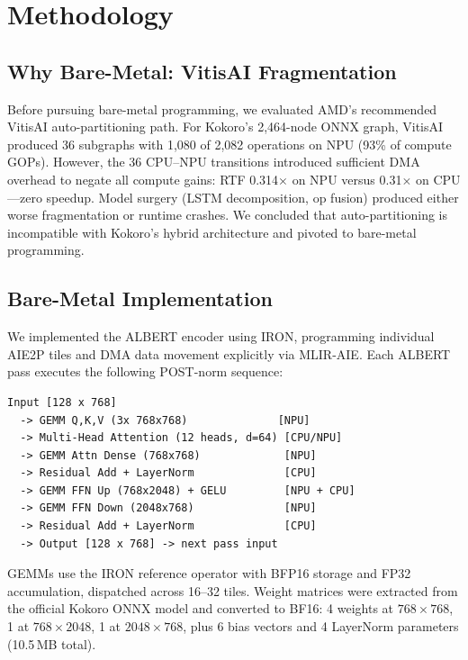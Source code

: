 \documentclass[11pt]{article}
\begin{document}
\section{Methodology}

\subsection{Why Bare-Metal: VitisAI Fragmentation}
\label{sec:vitisai}

Before pursuing bare-metal programming, we evaluated AMD's recommended VitisAI auto-partitioning path. For Kokoro's 2,464-node ONNX graph, VitisAI produced 36 subgraphs with 1,080 of 2,082 operations on NPU (93\% of compute GOPs). However, the 36 CPU--NPU transitions introduced sufficient DMA overhead to negate all compute gains: RTF 0.314$\times$ on NPU versus 0.31$\times$ on CPU---zero speedup. Model surgery (LSTM decomposition, op fusion) produced either worse fragmentation or runtime crashes. We concluded that auto-partitioning is incompatible with Kokoro's hybrid architecture and pivoted to bare-metal programming.

\subsection{Bare-Metal Implementation}

We implemented the ALBERT encoder using IRON, programming individual AIE2P tiles and DMA data movement explicitly via MLIR-AIE. Each ALBERT pass executes the following POST-norm sequence:

\begin{lstlisting}
Input [128 x 768]
  -> GEMM Q,K,V (3x 768x768)              [NPU]
  -> Multi-Head Attention (12 heads, d=64) [CPU/NPU]
  -> GEMM Attn Dense (768x768)             [NPU]
  -> Residual Add + LayerNorm              [CPU]
  -> GEMM FFN Up (768x2048) + GELU         [NPU + CPU]
  -> GEMM FFN Down (2048x768)              [NPU]
  -> Residual Add + LayerNorm              [CPU]
  -> Output [128 x 768] -> next pass input
\end{lstlisting}

GEMMs use the IRON reference operator with BFP16 storage and FP32 accumulation, dispatched across 16--32 tiles. Weight matrices were extracted from the official Kokoro ONNX model and converted to BF16: 4 weights at $768{\times}768$, 1 at $768{\times}2048$, 1 at $2048{\times}768$, plus 6 bias vectors and 4 LayerNorm parameters (10.5\,MB total).
\end{document}
